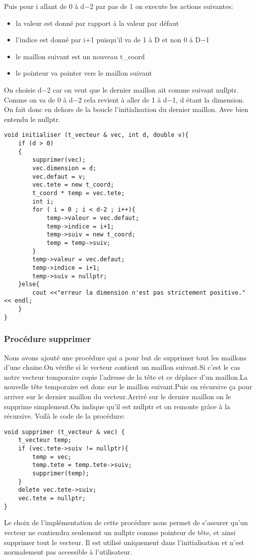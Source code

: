 \documentclass[a4paper,11pt,final]{article}
\begin{document}
Puis pour i allant de 0 à d$-$2 par pas de 1 on execute les actions suivantes:
\begin{itemize}
    \item la valeur est donné par rapport à la valeur par défaut
    \item l'indice est donné par i$+$1 puisqu'il va de 1 à D et non 0 à D$-$1
    \item le maillon suivant est un nouveau t\_coord
    \item le pointeur va pointer vers le maillon suivant
\end{itemize}
On choisie d$-$2 car on veut que le dernier maillon ait comme suivant nullptr. Comme on va de 0 à d$-$2 cela revient à aller de 1 à d$-$1, d étant la dimension. On fait donc en dehors de la boucle l'initialisation du dernier maillon.
Avec bien entendu  le nullptr.
\begin{verbatim}
void initialiser (t_vecteur & vec, int d, double v){
    if (d > 0)
    {
        supprimer(vec);
        vec.dimension = d;
        vec.defaut = v;
        vec.tete = new t_coord;
        t_coord * temp = vec.tete;
        int i;
        for ( i = 0 ; i < d-2 ; i++){
            temp->valeur = vec.defaut;
            temp->indice = i+1;
            temp->suiv = new t_coord;
            temp = temp->suiv;
        }
        temp->valeur = vec.defaut;
        temp->indice = i+1;
        temp->suiv = nullptr;
    }else{
        cout <<"erreur la dimension n'est pas strictement positive." << endl;
    }
}    
\end{verbatim}
\subsubsection{Procédure supprimer}
Nous avons ajouté une procédure qui a pour but de supprimer tout les maillons d'une chaine.On vérifie si le vecteur contient un maillon suivant.Si c'est le cas notre vecteur temporaire copie l'adresse de la tête et ce déplace d'un maillon.La nouvelle tête temporaire est donc sur le maillon suivant.Puis on récursive ça pour arriver sur le dernier maillon du vecteur.Arrivé sur le dernier maillon on le supprime simplement.On indique qu'il est nullptr et on remonte grâce à la récursive.
Voilà le code de la procédure:
\begin{verbatim}
void supprimer (t_vecteur & vec) {
    t_vecteur temp;
    if (vec.tete->suiv != nullptr){
        temp = vec;
        temp.tete = temp.tete->suiv;
        supprimer(temp);
    }
    delete vec.tete->suiv;
    vec.tete = nullptr;
}
\end{verbatim}
Le choix de l'implémentation de cette procédure nous permet de s'assurer qu'un vecteur ne contiendra seulement un nullptr comme pointeur de tête, et ainsi supprimer tout le vecteur. Il est utilisé uniquement dans l'initialisation et n'est normalement pas accessible à l'utilisateur.
\end{document}
